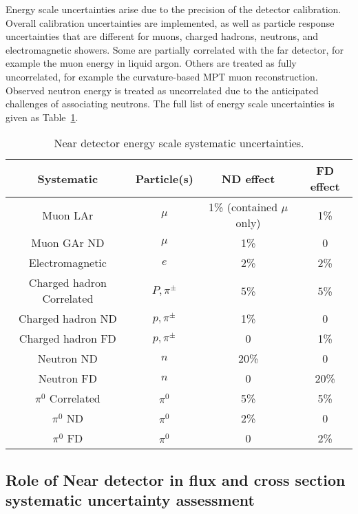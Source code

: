 Energy scale uncertainties arise due to the precision of the detector calibration. Overall calibration uncertainties are implemented, as well as particle response uncertainties that are different for muons, charged hadrons, neutrons, and electromagnetic showers. Some are partially correlated with the far detector, for example the muon energy in liquid argon. Others are treated as fully uncorrelated, for example the curvature-based MPT muon reconstruction. Observed neutron energy is treated as uncorrelated due to the anticipated challenges of associating neutrons. The full list of energy scale uncertainties is given as Table~\ref{tab:NDenergyScaleSysts}.

\begin{table}
\begin{tabular}{|c|c|c|c|}
    \hline
    Systematic & Particle(s) & ND effect & FD effect \\
    \hline
    Muon LAr  & $\mu$ & 1\% (contained $\mu$ only) & 1\% \\
    Muon GAr ND & $\mu$ & 1\% & 0 \\
    Electromagnetic & $e$ & 2\% & 2\% \\
    Charged hadron Correlated & $P, \pi^{\pm}$ & 5\% & 5\% \\
    Charged hadron ND &  $p, \pi^{\pm}$ & 1\% & 0 \\
    Charged hadron FD &  $p, \pi^{\pm}$ & 0 & 1\% \\
    Neutron ND & $n$ & 20\% & 0 \\
    Neutron FD & $n$ & 0 & 20\% \\
    $\pi^{0}$ Correlated & $\pi^{0}$ & 5\% & 5\% \\
    $\pi^{0}$ ND & $\pi^{0}$ & 2\% & 0 \\
    $\pi^{0}$ FD & $\pi^{0}$ & 0 & 2\% \\
    \hline
\end{tabular}
\caption{Near detector energy scale systematic uncertainties.}
\label{tab:NDenergyScaleSysts}
\end{table}

\subsection{Role of Near detector in flux and cross section systematic uncertainty assessment}

